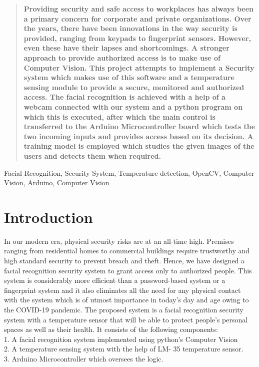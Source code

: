 \documentclass[conference]{IEEEtran}
\begin{document}
	\begin{abstract}
		\textbf{Providing security and safe access to workplaces has always     been a primary concern for
			corporate and private organizations. Over the years,
			there have been innovations in the way security is
			provided, ranging from keypads to fingerprint sensors.
			However, even these have their lapses and
			shortcomings. A stronger approach to provide
			authorized access is to make use of Computer Vision. This project attempts to implement a Security system which makes use of this software and a
			temperature sensing module to provide a secure,
			monitored and authorized access. The facial recognition
			is achieved with a help of a webcam connected with our system and a python program on which this is executed,
			after which the main control is transferred to the Arduino
			Microcontroller board which tests the two incoming
			inputs and provides access based on its decision. A training model is employed which studies the given
			images of the users and detects them when required.\\}
	\end{abstract}
	
	\begin{keywords}
		Facial Recognition, Security System, Temperature
		detection, OpenCV, Computer Vision, Arduino, Computer Vision
	\end{keywords}
	
	\IEEEpeerreviewmaketitle
	
	
	
	\section{Introduction}
	In our modern era, physical security risks are at an all-time high. Premises ranging from residential homes to commercial
	buildings require trustworthy and high standard security
	to prevent breach and theft. Hence, we have
	designed a facial recognition security system to grant
	access only to authorized people. This system is considerably more
	efficient than a password-based system or a fingerprint
	system and it also eliminates all the need for any physical contact with the system which is of utmost importance in today's day and age owing to the COVID-19 pandemic.
	The proposed system is a facial recognition security system with a temperature sensor that will be able to protect people’s
	personal spaces as well as their health. It consists of the
	following components: \\
	1. A facial recognition system implemented using python's Computer Vision \\
	2. A temperature sensing system with the help of LM-
	35 temperature sensor. \\
	3. Arduino Microcontroller which oversees the logic.
	
\end{document}
